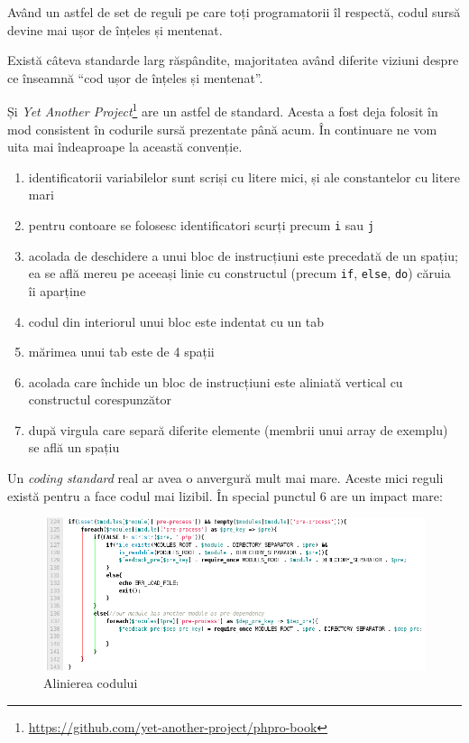 Având un astfel de set de reguli pe care toți programatorii îl respectă, codul
sursă devine mai ușor de înțeles și mentenat.

Există câteva standarde larg răspândite, majoritatea având diferite viziuni
despre ce înseamnă ``cod ușor de înțeles și mentenat''.

Și \textit{Yet Another Project}\footnote{\url{https://github.com/yet-another-project/phpro-book}}
are un astfel de standard. Acesta a fost deja folosit în mod consistent în codurile
sursă prezentate până acum. În continuare ne vom uita mai îndeaproape la această
convenție.

\begin{enumerate}
\item identificatorii variabilelor sunt scriși cu litere mici, și ale constantelor cu litere mari
\item pentru contoare se folosesc identificatori scurți precum \texttt{i} sau \texttt{j}
\item acolada de deschidere a unui bloc de instrucțiuni este precedată de un spațiu;
ea se află mereu pe aceeași linie cu constructul (precum \texttt{if}, \texttt{else}, \texttt{do}) căruia îi aparține
\item codul din interiorul unui bloc este indentat cu un tab
\item mărimea unui tab este de 4 spații
\item acolada care închide un bloc de instrucțiuni este aliniată vertical cu constructul corespunzător
\item după virgula care separă diferite elemente (membrii unui array de exemplu) se află un spațiu
\end{enumerate}

Un \textit{coding standard} real ar avea o anvergură mult mai mare. Aceste mici reguli există pentru
a face codul mai lizibil. În special punctul 6 are un impact mare:

\begin{figure}[ht!]
  \centering
    \includegraphics[scale=.5]{cap02/code_align.png}
  \caption{Alinierea codului}
  \label{fig:code_align}
\end{figure}

